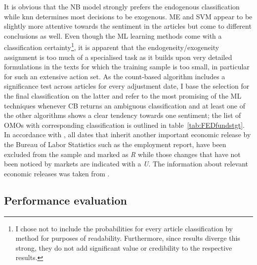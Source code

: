 %
It is obvious that the NB model strongly prefers the endogenous classification while knn determines most decisions to be exogenous. ME and SVM appear to be slightly more attentive towards the sentiment in the articles but come to different conclusions as well. Even though the ML learning methods come with a classification certainty\footnote{I chose not to include the probabilities for every article classification by method for purposes of readability. Furthermore, since results diverge this strong, they do not add significant value or credibility to the respective results.}, it is apparent that the endogeneity/exogeneity assignment is too much of a specialised task as it builds upon very detailed formulations in the texts for which the training sample is too small, in particular for such an extensive action set. As the count-based algorithm includes a significance test across articles for every adjustment date, I base the selection for the final classification on the latter and refer to the most promising of the ML techniques whenever CB returns an ambiguous classification and at least one of the other algorithms shows a clear tendency towards one sentiment; the list of OMOs with corresponding classification is outlined in table~\vref{tab:FEDfundstgt}. %
In accordance with \textcite{Ellingsen.2003}, all dates that inherit another important economic release by the Bureau of Labor Statistics such as the employment report, have been excluded from the sample and marked as \textit{R} while those changes that have not been noticed by markets are indicated with a \textit{U}. The information about relevant economic releases was taken from \textcite{BoLS.2017}.

%
\subsection{Performance evaluation}

